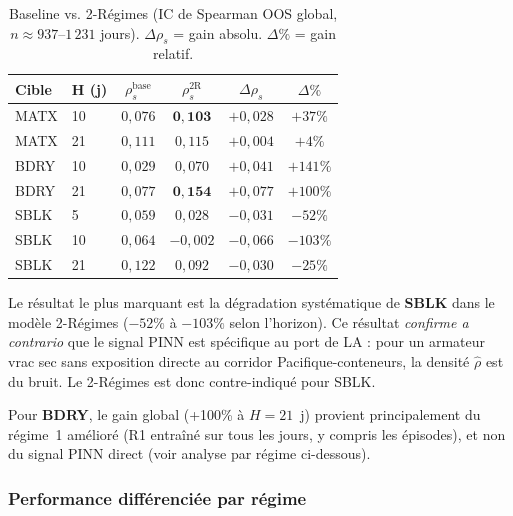 \begin{table}[ht]
\centering
\caption{Baseline vs. 2-Régimes (IC de Spearman OOS global,
$n \approx 937$--$1\,231$ jours). $\Delta\rho_s$ = gain absolu.
$\Delta\%$ = gain relatif.}
\label{tab:tworegime_global}
\small
\begin{tabular}{llcccc}
\toprule
\textbf{Cible} & \textbf{H (j)} & $\rho_s^{\text{base}}$ &
$\rho_s^{\text{2R}}$ & $\Delta\rho_s$ & $\Delta\%$ \\
\midrule
MATX & 10 & $0{,}076$ & $\mathbf{0{,}103}$ & $+0{,}028$ & $+37\%$ \\
MATX & 21 & $0{,}111$ & $0{,}115$ & $+0{,}004$ & $+4\%$ \\
\addlinespace
BDRY & 10 & $0{,}029$ & $0{,}070$ & $+0{,}041$ & $+141\%$ \\
BDRY & 21 & $0{,}077$ & $\mathbf{0{,}154}$ & $+0{,}077$ & $+100\%$ \\
\addlinespace
SBLK &  5 & $0{,}059$ & $0{,}028$ & $-0{,}031$ & $-52\%$ \\
SBLK & 10 & $0{,}064$ & $-0{,}002$ & $-0{,}066$ & $-103\%$ \\
SBLK & 21 & $0{,}122$ & $0{,}092$ & $-0{,}030$ & $-25\%$ \\
\bottomrule
\end{tabular}
\end{table}

\noindent
Le résultat le plus marquant est la dégradation systématique de \textbf{SBLK}
dans le modèle 2-Régimes ($-52\%$ à $-103\%$ selon l'horizon). Ce résultat
\emph{confirme a contrario} que le signal PINN est spécifique au port de
LA : pour un armateur vrac sec sans exposition directe au corridor
Pacifique-conteneurs, la densité $\hat{\rho}$ est du bruit. Le
2-Régimes est donc contre-indiqué pour SBLK.

Pour \textbf{BDRY}, le gain global (+100\% à $H = 21$~j) provient
principalement du régime~1 amélioré (R1 entraîné sur tous les jours, y
compris les épisodes), et non du signal PINN direct (voir analyse par régime
ci-dessous).

\subsubsection{Performance différenciée par régime}

